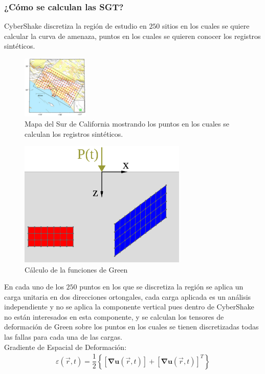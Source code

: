 \begin{frame}[allowframebreaks]
\frametitle{¿Cómo se calculan las SGT?}
%
\justifying
%
CyberShake discretiza la región de estudio en $250$ sitios en los cuales se quiere calcular la curva de amenaza, puntos en los cuales se quieren conocer los registros sintéticos.
%
\begin{figure}[h]
	\centering
	\includegraphics[height=3cm]{img/Discretizacion.pdf}
	\caption{Mapa del Sur de California mostrando los puntos en los cuales se calculan los registros sintéticos. \cite[figura 1, página 3]{gravesetal}}
	\vspace{-.5 cm}
\end{figure}
%
%
\begin{figure}[h]
	\centering
	\includegraphics[height=6cm]{img/SGT.pdf}
	\caption{Cálculo de la funciones de Green}
	\vspace{-.5 cm}
\end{figure}
%
%
En cada uno de los $250$ puntos en los que se discretiza la región se aplica un carga unitaria en dos direcciones ortongales, cada carga aplicada es un análisis independiente y no se aplica la componente vertical pues dentro de CyberShake no están interesados en esta componente, y se calculan los tensores de deformación de Green sobre los puntos en los cuales se tienen discretizadas todas las fallas para cada una de las cargas.\\
%
Gradiente de Espacial de Deformación:
%
\begin{align*}
	\varepsilon \left( \vec{r}, t \right) = \dfrac{1}{2} \left\lbrace \left[ \mathbf{\nabla u } \left( \vec{r}, t \right) \right] + \left[ \mathbf{\nabla u} \left( \vec{r}, t \right) \right]^T \right\rbrace

\end{align*}
\end{frame}
